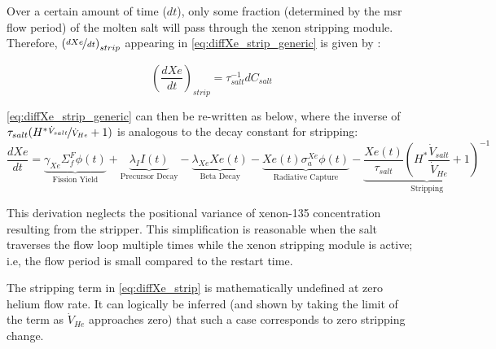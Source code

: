 Over a certain amount of time ($dt$), only some fraction (determined by the \acs{msr} flow period) of the molten salt will pass through the xenon stripping module.  Therefore, $\left(\nicefrac{dXe}{dt}\right)_{strip}$ appearing in \ref{eq:diffXe_strip_generic} is given by : 

\begin{equation}\label{eq:dXedt-strip}
    \left(\frac{dXe}{dt}\right)_{strip} = \tau_{salt}^{-1}{dC_{salt}}
\end{equation}



\ref{eq:diffXe_strip_generic} can then be re-written as 
below, where the inverse of $\tau_{salt}(H^*\nicefrac{\dot{V}_{salt}}{\dot{V}_{He}}+1)$ is analogous to the decay constant for stripping: 
\vspace{-0.5\baselineskip}
\begin{equation}\label{eq:diffXe_strip}
        \frac{dXe}{dt} =
        \underbrace{\gamma_{Xe}\Sigma_{f}^{F}{\phi}(t)}_{\text{Fission Yield}}
        +\underbrace{\lambda_{I}I(t)}_{\text{Precursor Decay}}
        -\underbrace{\lambda_{Xe}Xe(t)}_{\text{Beta Decay}}
        -\underbrace{Xe(t)\sigma_{a}^{Xe}{\phi}(t)}_{\text{Radiative Capture}}
        -\underbrace{ \frac{Xe(t)}{\tau_{salt}}\left( H^*\frac{\dot{V}_{salt}}{\dot{V}_{He}}+1 \right)^{-1}}_{\text{Stripping}}
\end{equation}

This derivation neglects the positional variance of xenon-135 concentration resulting from the stripper. This simplification is reasonable when the salt traverses the flow loop multiple times while the xenon stripping module is active; i.e, the flow period is small compared to the restart time.

The stripping term in \ref{eq:diffXe_strip} is mathematically undefined at zero helium flow rate. It can logically be inferred (and shown by taking the limit of the term as $\dot{V}_{He}$ approaches zero) that such a case corresponds to zero stripping change.

